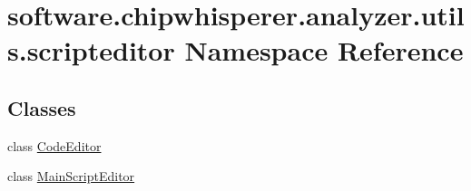 \hypertarget{namespacesoftware_1_1chipwhisperer_1_1analyzer_1_1utils_1_1scripteditor}{}\section{software.\+chipwhisperer.\+analyzer.\+utils.\+scripteditor Namespace Reference}
\label{namespacesoftware_1_1chipwhisperer_1_1analyzer_1_1utils_1_1scripteditor}
\subsection*{Classes}
\begin{DoxyCompactItemize}
\item 
class \hyperlink{classsoftware_1_1chipwhisperer_1_1analyzer_1_1utils_1_1scripteditor_1_1CodeEditor}{Code\+Editor}
\item 
class \hyperlink{classsoftware_1_1chipwhisperer_1_1analyzer_1_1utils_1_1scripteditor_1_1MainScriptEditor}{Main\+Script\+Editor}
\end{DoxyCompactItemize}
